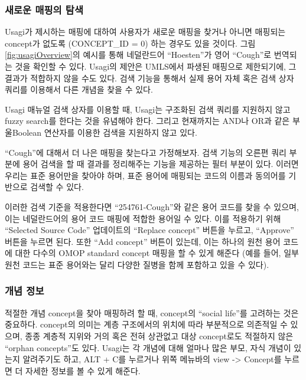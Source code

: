 \documentclass[10.5pt]{book}
\theoremstyle{definition}
\theoremstyle{definition}
\theoremstyle{definition}
\theoremstyle{remark}
\begin{document}
\subsubsection*{새로운 매핑의 탐색}\label{--}

Usagi가 제시하는 매핑에 대하여 사용자가 새로운 매핑을 찾거나 아니면
매핑되는 concept가 없도록 (CONCEPT\_ID = 0) 하는 경우도 있을 것이다.
그림 \ref{fig:usagiOverview}의 예시를 통해 네덜란드어 ``Hoesten''가 영어
``Cough''로 번역되는 것을 확인할 수 있다. Usagi의 제안은 UMLS에서 파생된
매핑으로 제한되기에, 그 결과가 적합하지 않을 수도 있다. 검색 기능을
통해서 실제 용어 자체 혹은 검색 상자 쿼리를 이용해서 다른 개념을 찾을 수
있다.

Usagi 매뉴얼 검색 상자를 이용할 때, Usagi는 구조화된 검색 쿼리를
지원하지 않고 fuzzy search를 한다는 것을 유념해야 한다. 그리고
현재까지는 AND나 OR과 같은 부울Boolean 연산자를 이용한 검색을 지원하지
않고 있다.

``Cough''에 대해서 더 나은 매핑을 찾는다고 가정해보자. 검색 기능의
오른편 쿼리 부분에 용어 검색을 할 때 결과를 정리해주는 기능을 제공하는
필터 부분이 있다. 이러면 우리는 표준 용어만을 찾아야 하며, 표준 용어에
매핑되는 코드의 이름과 동의어를 기반으로 검색할 수 있다.

이러한 검색 기준을 적용한다면 ``254761-Cough''와 같은 용어 코드를 찾을
수 있으며, 이는 네덜란드어의 용어 코드 매핑에 적합한 용어일 수 있다.
이를 적용하기 위해 ``Selected Source Code'' 업데이트의 ``Replace
concept'' 버튼을 누르고, ``Approve'' 버튼을 누르면 된다. 또한 ``Add
concept'' 버튼이 있는데, 이는 하나의 원천 용어 코드에 대한 다수의 OMOP
standard concept 매핑을 할 수 있게 해준다 (예를 들어, 일부 원천 코드는
표준 용어와는 달리 다양한 질병을 함께 포함하고 있을 수 있다).

\subsubsection*{개념 정보}\label{-}

적절한 개념 concept을 찾아 매핑하려 할 때, concept의 ``social life''를
고려하는 것은 중요하다. concept의 의미는 계층 구조에서의 위치에 따라
부분적으로 의존적일 수 있으며, 종종 계층적 지위와 거의 혹은 전혀
상관없고 대상 concept로도 적절하지 않은 ``orphan concepts''도 있다.
Usagi는 각 개념에 대해 얼마나 많은 부모, 자식 개념이 있는지 알려주기도
하고, ALT + C를 누르거나 위쪽 메뉴바의 view -\textgreater{} Concept를
누르면 더 자세한 정보를 볼 수 있게 해준다.
\end{document}
